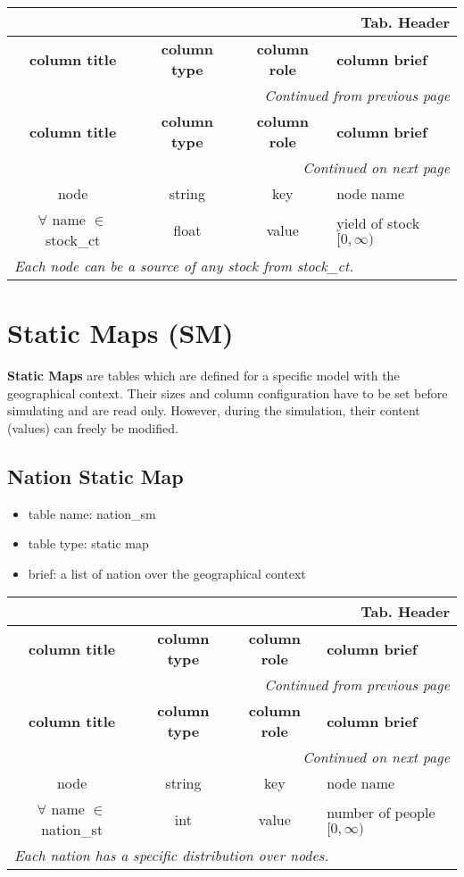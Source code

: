 \documentclass[a4paper,oneside,titlepage]{report}
\newcommand*{\LTHeaderIV}[5]{
  \multicolumn{4}{r}{\textbf{Tab. \thesubsection} \textbf{#1}}\\    
  \hline
  \textbf{#2} & \textbf{#3} & \textbf{#4} & \textbf{#5}\\
  \hline
  
  \endfirsthead
  \multicolumn{4}{r}{\textit{Continued from previous page}}\\    
  \hline
  \textbf{#2} & \textbf{#3} & \textbf{#4} & \textbf{#5}\\
  \hline
  \endhead
  \hline
  \multicolumn{4}{r}{\textit{Continued on next page}}\\
  \endfoot
  \hline
  \endlastfoot  
}
\begin{document}
\begin{longtable}{ |c|c|c|l| } 
  \LTHeaderIV{Header}{column title}{column type}{column role}{column brief}                    
  node & string & key & node name\\
  $\forall$ name $\in$ stock\_ct & float & value & yield of stock $[0, \infty)$ \\
  \multicolumn{4}{|l|}{\textit{Each node can be a source of any stock from stock\_ct.}}\\
\end{longtable}        

\section{Static Maps (SM)}
\textbf{Static Maps} are tables which are defined for a specific model with the geographical context. Their sizes and column configuration have to be set before simulating and are read only. However, during the simulation, their content (values) can freely be modified.

\subsection{Nation Static Map}
\begin{itemize}
  \setlength{\itemsep}{0pt}
  \setlength{\parskip}{0pt}
\item table name: nation\_sm  
\item table type: static map  
\item brief: a list of nation over the geographical context
\end{itemize}

\begin{longtable}{ |c|c|c|l| } 
  \LTHeaderIV{Header}{column title}{column type}{column role}{column brief}                    
  node & string & key & node name\\
  $\forall$ name $\in$ nation\_st & int & value & number of people $[0, \infty)$ \\
  \multicolumn{4}{|l|}{\textit{Each nation has a specific distribution over nodes.}}\\
\end{longtable}        

\end{document}
